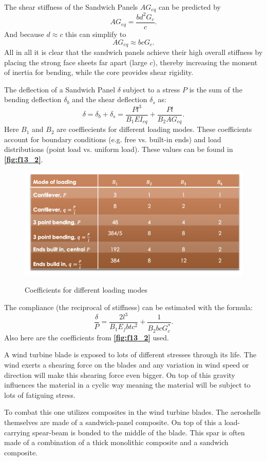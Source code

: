 The shear stiffness of the Sandwich Panels $AG_{eq}$ can be predicted by
\[ 
AG_{eq} = \frac{b d^2 G_c}{c}
.\]
And because $d \approx c$ this can simplify to
\[ 
AG_{eq} \approx b c G_c
.\]
All in all it is clear that the sandwich panels achieve their high overall stiffness by placing the strong face sheets far apart (large $c$), thereby increasing the moment of inertia for bending, while the core provides shear rigidity.

The deflection of a Sandwich Panel $\delta$ subject to a stress $P$ is the sum of the bending deflection $\delta_b$ and the shear deflection $\delta_s$ as:
\[ 
\delta = \delta_b + \delta_s = \frac{P l^3}{B_1 EI_{eq}} + \frac{P l}{B_2 AG_{eq}}
.\]
Here $B_1$ and $B_2$ are coeffiecients for different loading modes. These coefficients account for boundary conditions (e.g. free vs. built-in ends) and load distributions (point load vs. uniform load). These values can be found in \textbf{\autoref{fig:f13_2}}.

\begin{figure} [ht]
  \centering
  \caption{Coefficients for different loading modes}
  \includegraphics[width=0.5\linewidth]{./figures/f13_2.png}
  \label{fig:f13_2}
\end{figure}

The compliance (the reciprocal of stiffness) can be estimated with the formula:
\[ 
\frac{\delta}{P} = \frac{2 l^3}{B_1 E_f b t c^2} + \frac{1}{B_2 b c G_{c}^{*}}
.\]
Also here are the coefficients from \textbf{\autoref{fig:f13_2}} used.


\begin{exa}
  A wind turbine blade is exposed to lots of different stresses through its life. The wind exerts a shearing force on the blades and any variation in wind speed or direction will make this shearing force even bigger. On top of this gravity influences the material in a cyclic way meaning the material will be subject to lots of fatiguing stress.

  To combat this one utilizes composites in the wind turbine blades. The aeroshells themselves are made of a sandwich-panel composite. On top of this a load-carrying spear-beam is bonded to the middle of the blade. This spar is often made of a combination of a thick monolithic composite and a sandwich composite. 
\end{exa}
